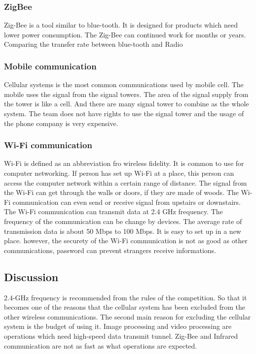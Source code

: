 \documentclass[letterpaper, 10, draftclsnofoot, onecolumn, compsoc]{IEEEtran}
\begin{document}
{\subsubsection{ZigBee}
Zig-Bee\cite{r2} is a tool similar to blue-tooth. It is designed for products which need lower power consumption.
The Zig-Bee can continued work for months or years. Comparing the transfer rate between blue-tooth and Radio

\subsubsection{Mobile communication}
Cellular systems is the most common communications used by mobile cell.
The mobile uses the signal from the signal towers.
The area of the signal supply from the tower is like a cell.
And there are many signal tower to combine as the whole system.
The team does not have rights to use the signal tower and
the usage of the phone company is very expensive.

\subsubsection{Wi-Fi communication}
Wi-Fi\cite{r3} is defined as an abbreviation fro wireless fidelity. It is common to use for computer networking.
If person has set up Wi-Fi at a place, this person can access the computer network within a certain range of distance.
The signal from the Wi-Fi can get through the walls or doors, if they are made of woods.
The Wi-Fi communication can even send or receive signal from upstairs or downstairs.
The Wi-Fi communication can transmit data at 2.4 GHz frequency. The frequency of the communication can be change by devices.
The average rate of transmission data is about 50 Mbps to 100 Mbps. It is easy to set up in a new place.
however, the securety of the Wi-Fi communication is not as good as other communications, password can prevent strangers receive informations.

\subsection{Discussion}
2.4-GHz frequency is recommended from the rules of the competition.
So that it becomes one of the reasons that the cellular system has been excluded from the other wireless communications.
The second main reason for excluding the cellular system is the budget of using it.
Image processing and video processing are operations which need high-speed data transmit tunnel.
Zig-Bee and Infrared communication are not as fast as what operations are expected.

}
\end{document}
